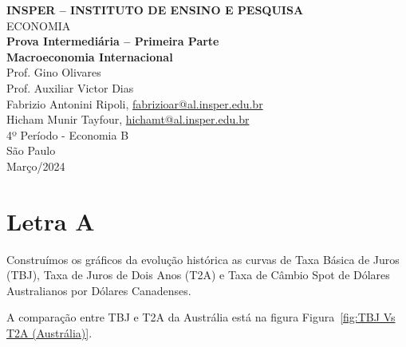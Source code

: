 \documentclass[a4paper,12pt]{article}[abntex2]
\begin{document}
\begin{titlepage}
    \centering
    \vspace*{1cm}
    \Large\textbf{INSPER – INSTITUTO DE ENSINO E PESQUISA}\\
    \Large ECONOMIA\\
    \vspace{1.5cm}
    \Large\textbf{Prova Intermediária – Primeira Parte}\\
    \textbf{Macroeconomia Internacional}\\
    \vspace{1.5cm}
    Prof. Gino Olivares\\
    Prof. Auxiliar Victor Dias \\
    \vfill
    \normalsize
    Fabrizio Antonini Ripoli, \href{mailto:fabrizioar@al.insper.edu.br}{fabrizioar@al.insper.edu.br}\\
    Hicham Munir Tayfour, \href{mailto:hichamt@al.insper.edu.br}{hichamt@al.insper.edu.br}\\
    4º Período - Economia B\\
    \vfill
    São Paulo\\
    Março/2024
\end{titlepage}

\newpage
\tableofcontents
\thispagestyle{empty} %
\newpage
\setcounter{page}{1} %
\justify
\onehalfspacing

\pagestyle{fancy}
\fancyhf{}
\rhead{\thepage}

\section{\textbf{Letra A}}
Construímos os gráficos da evolução histórica as curvas de Taxa Básica de Juros (TBJ), Taxa de Juros de Dois Anos (T2A) e Taxa de Câmbio Spot de Dólares Australianos por Dólares Canadenses.

A comparação entre TBJ e T2A da Austrália está na figura Figura~\ref{fig:TBJ Vs T2A (Austrália)}.
\end{document}
